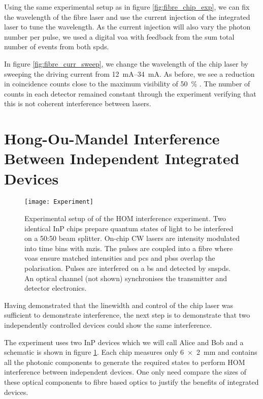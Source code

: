 Using the same experimental setup as in figure \ref{fig:fibre_chip_exp}, we can fix the wavelength of the fibre laser and use the current injection of the integrated laser to tune the wavelength. As the current injection will also vary the photon number per pulse, we used a digital \ac{voa} with feedback from the sum total number of events from both \acp{spd}. 

In figure \ref{fig:fibre_curr_sweep}, we change the wavelength of the chip laser by sweeping the driving current from \SIrange{12}{34}{mA}. As before, we see a reduction in coincidence counts close to the maximum visibility of \SI{50}{\percent} \cite{Rarity2005}. The number of counts in each detector remained constant through the experiment verifying that this is not coherent interference between lasers.

\section{Hong-Ou-Mandel Interference Between Independent Integrated Devices}

\begin{figure}[tp]
	\centering
	\texttt{[image: Experiment]}
	\caption[Hong-Ou-Mandel interference experimental setup]{Experimental setup of of the \ac{HOM} interference experiment. Two identical \ac{InP} chips prepare quantum states of light to be interfered on a {50:50} beam splitter. On-chip \ac{CW} lasers are intensity modulated into time bins with \acp{mzi}. The pulses are coupled into a fibre where \acfp{voa} ensure matched intensities and \acfp{pc} and \acfp{pbs} overlap the polarisation. Pulses are interfered on a \acf{bs} and detected by \acfp{snspd}. An optical channel (not shown) synchronises the transmitter and detector electronics.}
	\label{fig:hom_experiment}
\end{figure}

Having demonstrated that the linewidth and control of the chip laser was sufficient to demonstrate interference, the next step is to demonstrate that two independently controlled devices could show the same interference. 

The experiment uses two \ac{InP} devices which we will call Alice and Bob and a schematic is shown in figure \ref{fig:hom_experiment}. Each chip measures only \SI{6x2}{mm} and contains all the photonic components to generate the required states to perform \ac{HOM} interference between independent devices. One only need compare the sizes of these optical components to fibre based optics to justify the benefits of integrated devices.

